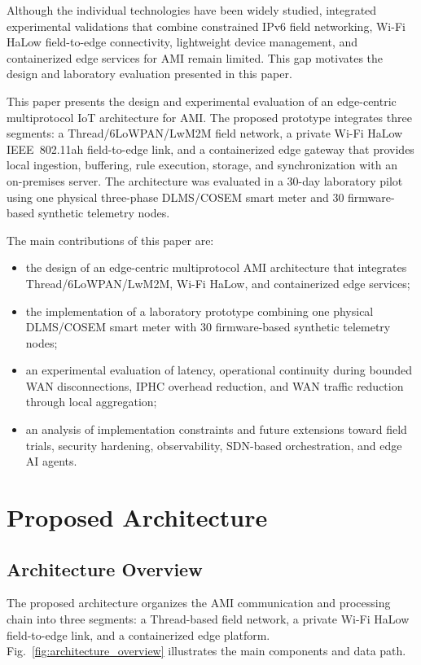 \documentclass[conference]{IEEEtran}
\begin{document}
Although the individual technologies have been widely studied, integrated experimental validations that combine constrained IPv6 field networking, Wi-Fi HaLow field-to-edge connectivity, lightweight device management, and containerized edge services for AMI remain limited. This gap motivates the design and laboratory evaluation presented in this paper.

This paper presents the design and experimental evaluation of an edge-centric multiprotocol IoT architecture for AMI. The proposed prototype integrates three segments: a Thread/6LoWPAN/LwM2M field network, a private Wi-Fi HaLow IEEE~802.11ah field-to-edge link, and a containerized edge gateway that provides local ingestion, buffering, rule execution, storage, and synchronization with an on-premises server. The architecture was evaluated in a 30-day laboratory pilot using one physical three-phase DLMS/COSEM smart meter and 30 firmware-based synthetic telemetry nodes.

The main contributions of this paper are:
\begin{itemize}
\item the design of an edge-centric multiprotocol AMI architecture that integrates Thread/6LoWPAN/LwM2M, Wi-Fi HaLow, and containerized edge services;
\item the implementation of a laboratory prototype combining one physical DLMS/COSEM smart meter with 30 firmware-based synthetic telemetry nodes;
\item an experimental evaluation of latency, operational continuity during bounded WAN disconnections, IPHC overhead reduction, and WAN traffic reduction through local aggregation;
\item an analysis of implementation constraints and future extensions toward field trials, security hardening, observability, SDN-based orchestration, and edge AI agents.
\end{itemize}


\section{Proposed Architecture}
\label{sec:proposed_architecture}

\subsection{Architecture Overview}
\label{subsec:architecture_overview}

The proposed architecture organizes the AMI communication and processing chain into three segments: a Thread-based field network, a private Wi-Fi HaLow field-to-edge link, and a containerized edge platform. Fig.~\ref{fig:architecture_overview} illustrates the main components and data path.
\end{document}
